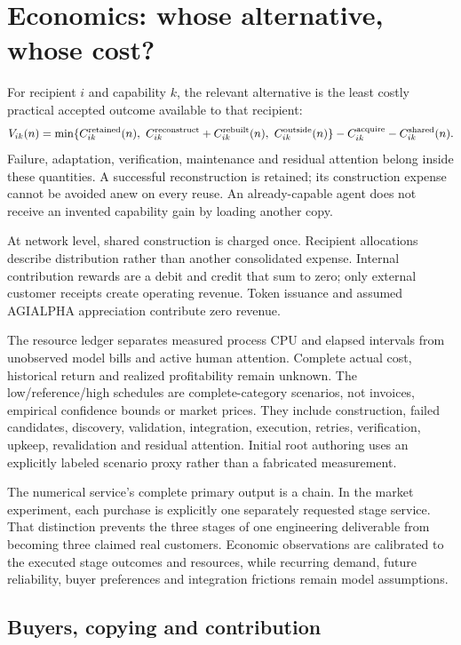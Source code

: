 \documentclass[11pt,letterpaper]{article}
\begin{document}
\section{Economics: whose alternative, whose cost?}

For recipient $i$ and capability $k$, the relevant alternative is the least costly practical accepted outcome available to that recipient:
\[
V_{ik}(n)=
\min\{C^{\rm retained}_{ik}(n),\
C^{\rm reconstruct}_{ik}+C^{\rm rebuilt}_{ik}(n),\
C^{\rm outside}_{ik}(n)\}
-C^{\rm acquire}_{ik}-C^{\rm shared}_{ik}(n).
\]
Failure, adaptation, verification, maintenance and residual attention belong inside these quantities. A successful reconstruction is retained; its construction expense cannot be avoided anew on every reuse. An already-capable agent does not receive an invented capability gain by loading another copy.

At network level, shared construction is charged once. Recipient allocations describe distribution rather than another consolidated expense. Internal contribution rewards are a debit and credit that sum to zero; only external customer receipts create operating revenue. Token issuance and assumed AGIALPHA appreciation contribute zero revenue.

The resource ledger separates measured process CPU and elapsed intervals from unobserved model bills and active human attention. Complete actual cost, historical return and realized profitability remain unknown. The low/reference/high schedules are complete-category scenarios, not invoices, empirical confidence bounds or market prices. They include construction, failed candidates, discovery, validation, integration, execution, retries, verification, upkeep, revalidation and residual attention. Initial root authoring uses an explicitly labeled scenario proxy rather than a fabricated measurement.

The numerical service's complete primary output is a chain. In the market experiment, each purchase is explicitly one separately requested stage service. That distinction prevents the three stages of one engineering deliverable from becoming three claimed real customers. Economic observations are calibrated to the executed stage outcomes and resources, while recurring demand, future reliability, buyer preferences and integration frictions remain model assumptions.

\subsection{Buyers, copying and contribution}
\end{document}
